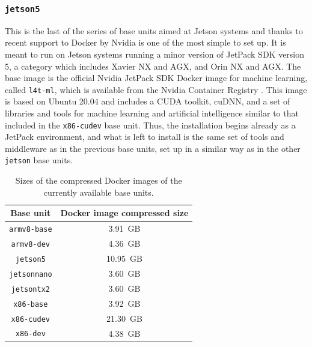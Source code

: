 \subsubsection{\texttt{jetson5}}
\label{sec:dua_base_units_jetson5}
This is the last of the series of base units aimed at Jetson systems and thanks to recent support to Docker by Nvidia is one of the most simple to set up. It is meant to run on Jetson systems running a minor version of JetPack SDK version 5, a category which includes Xavier NX and AGX, and Orin NX and AGX. The base image is the official Nvidia JetPack SDK Docker image for machine learning, called \texttt{l4t-ml}, which is available from the Nvidia Container Registry \cite{nvidia_nvidia_nodate}. This image is based on Ubuntu 20.04 and includes a CUDA toolkit, cuDNN, and a set of libraries and tools for machine learning and artificial intelligence similar to that included in the \texttt{x86-cudev} base unit. Thus, the installation begins already as a JetPack environment, and what is left to install is the same set of tools and middleware as in the previous base units, set up in a similar way as in the other \texttt{jetson} base units.

\begin{table}[ht]
  \centering
  \makeatletter
  \begin{tabular}{|c|c|}
    \hline
    \textbf{Base unit} & \textbf{Docker image compressed size} \\
    \hline
    \texttt{armv8-base} & \SI{3.91}{GB} \\
    \hline
    \texttt{armv8-dev} & \SI{4.36}{GB} \\
    \hline
    \texttt{jetson5} & \SI{10.95}{GB} \\
    \hline
    \texttt{jetsonnano} & \SI{3.60}{GB} \\
    \hline
    \texttt{jetsontx2} & \SI{3.60}{GB} \\
    \hline
    \texttt{x86-base} & \SI{3.92}{GB} \\
    \hline
    \texttt{x86-cudev} & \SI{21.30}{GB} \\
    \hline
    \texttt{x86-dev} & \SI{4.38}{GB} \\
    \hline
  \end{tabular}
  \makeatother
  \caption{Sizes of the compressed Docker images of the currently available base units.}
  \label{tab:dua_sizes}
\end{table}
